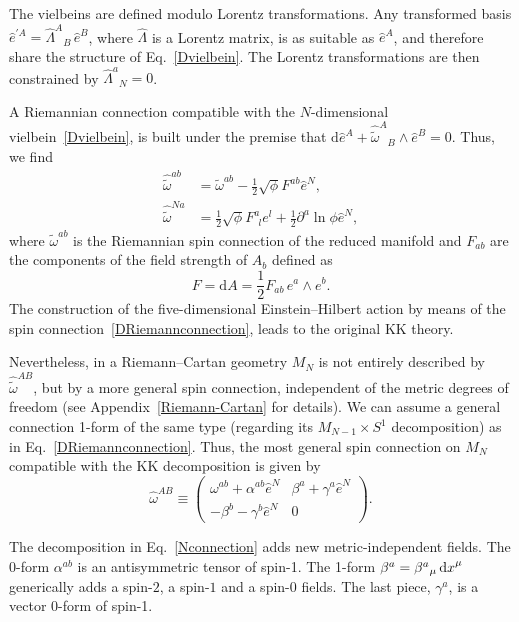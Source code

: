 \documentclass[aps,prd,12pt,superscriptaddress,showpacs,showkeys,longbibliography,reprint,nofootinbib]{revtex4-1}
\begin{document}
The vielbeins are defined modulo Lorentz transformations. Any transformed basis $\hat{e}^{\prime A} = \hat{\Lambda}^A{}_{B}\,\hat{e}^B$,
where $\hat{\Lambda}$ is a Lorentz matrix, is as suitable as $\hat{e}^A$, and therefore share the structure of Eq.~\eqref{Dvielbein}. The Lorentz transformations are then constrained by $\hat{\Lambda}^a{}_{N}=0$.

A Riemannian connection compatible with the \mbox{$N$-dimensional} vielbein~\eqref{Dvielbein}, is built under the premise that $\mbox{d}\hat{e}^A + \hat{\tilde{\omega}}^{A}{}_B \wedge \hat{e}^B = 0$. Thus, we find
\begin{equation}
  \label{DRiemannconnection}
  \begin{split}
    \hat{\tilde{\omega}}^{ab}&=\tilde{\omega}^{ab}-\frac{1}{2}\sqrt{\phi}F^{ab}\hat{e}^N,\\
    \hat{\tilde{\omega}}^{Na}&=\frac{1}{2}\sqrt{\phi}F^a_{\ \ l}e^l+\frac{1}{2}\partial^a\ln\phi\hat{e}^N,
  \end{split}
\end{equation}
where $\tilde{\omega}^{ab}$ is the Riemannian spin connection of the reduced manifold and $F_{ab}$ are the components of the field strength of $A_b$ defined as
\begin{equation}
  F=\text{d}A=\frac{1}{2}F_{ab}\, e^a\wedge e^b.
\end{equation}
The construction of the five-dimensional Einstein--Hilbert action by means of the spin connection~\eqref{DRiemannconnection}, leads to the original KK theory.

Nevertheless, in a Riemann--Cartan geometry $M_N$ is not entirely described by $\hat{\tilde{\omega}}^{AB}$, but by a more general spin connection, independent of the metric degrees of freedom (see Appendix~\ref{Riemann-Cartan} for details). We can assume a general connection 1-form of the same type (regarding its $M_{N-1}\times S^1$ decomposition) as in Eq.~\eqref{DRiemannconnection}. Thus, the most general spin connection on $M_N$ compatible with the KK decomposition is given by 
\begin{equation}\label{Nconnection}
  \hat{\omega}^{AB} \equiv
  \begin{pmatrix}
    \omega^{ab}+\alpha^{ab}\hat{e}^N & \beta^a+\gamma^a\hat{e}^N\\
    -\beta^b-\gamma^b\hat{e}^N & 0
  \end{pmatrix}.
\end{equation}

The decomposition in Eq.~\eqref{Nconnection} adds new metric-independent fields. The 0-form $\alpha^{ab}$ is an antisymmetric tensor of spin-1. The 1-form $\beta^a = \beta^a{}_\mu \mathop{\mathrm{d}x}\nolimits^\mu$ generically adds a spin-$2$, a spin-$1$ and a spin-$0$ fields. The last piece, $\gamma^a$, is a vector $0$-form of spin-1.
\end{document}
